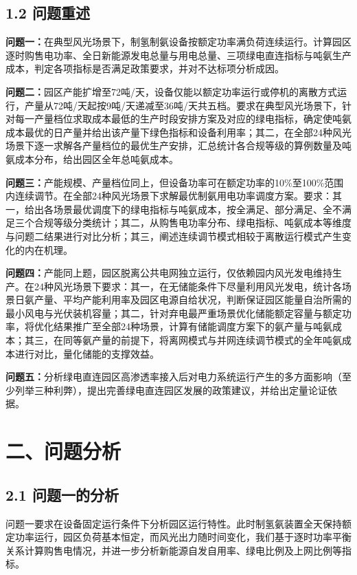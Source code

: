 \documentclass[zihao=-4,a4paper]{ctexart} %
\begin{document}
	\subsection*{1.2 问题重述}
	\textbf{问题一：}在典型风光场景下，制氢制氨设备按额定功率满负荷连续运行。计算园区逐时购售电功率、全日新能源发电总量与用电总量、三项绿电直连指标与吨氨生产成本，判定各项指标是否满足政策要求，并对不达标项分析成因。\par
	\textbf{问题二：}园区产能扩增至72吨/天，设备仅能以额定功率运行或停机的离散方式运行，产量从72吨/天起按9吨/天递减至36吨/天共五档。要求在典型风光场景下，针对每一产量档位求取成本最低的生产时段安排方案及对应的绿电指标，确定使吨氨成本最优的日产量并给出该产量下绿色指标和设备利用率；其二，在全部24种风光场景下逐一求解各产量档位的最优生产安排，汇总统计各合规等级的算例数量及吨氨成本分布，给出园区全年总吨氨成本。\par
	\textbf{问题三：}产能规模、产量档位同上，但设备功率可在额定功率的10\%至100\%范围内连续调节。在全部24种风光场景下求解最优制氨用电功率调度方案。要求：其一，给出各场景最优调度下的绿电指标与吨氨成本，按全满足、部分满足、全不满足三个合规等级分类统计；其二，从购售电功率分布、绿电指标、吨氨成本等维度与问题二结果进行对比分析；其三，阐述连续调节模式相较于离散运行模式产生变化的内在机理。\par
	\textbf{问题四：}产能同上题，园区脱离公共电网独立运行，仅依赖园内风光发电维持生产。在24种风光场景下要求：其一，在无储能条件下尽量利用风光发电，统计各场景日氨产量、平均产能利用率及园区电源自给状况，判断保证园区能量自治所需的最小风电与光伏装机容量；其二，针对弃电最严重场景优化储能额定容量与额定功率，将优化结果推广至全部24种场景，计算有储能调度方案下的氨产量与吨氨成本；其三，在同等氨产量的前提下，将离网模式与并网连续调节模式的全年吨氨成本进行对比，量化储能的支撑效益。\par
	\textbf{问题五：}分析绿电直连园区高渗透率接入后对电力系统运行产生的多方面影响（至少列举三种利弊），提出完善绿电直连园区发展的政策建议，并给出定量论证依据。
	
	\section*{二、问题分析}
	\subsection*{2.1 问题一的分析}
	
	问题一要求在设备固定运行条件下分析园区运行特性。此时制氢氨装置全天保持额定功率运行，园区负荷基本恒定，而风光出力随时间变化，我们基于逐时功率平衡关系计算购售电情况，并进一步分析新能源自发自用率、绿电比例及上网比例等指标。
	
\end{document}
